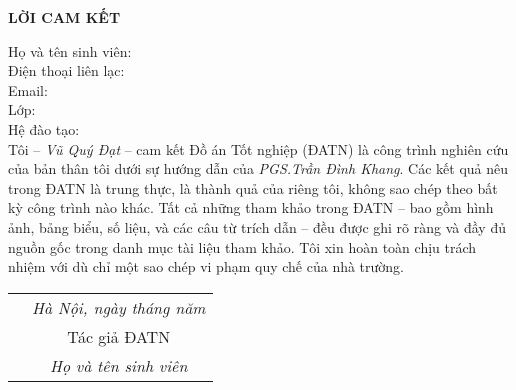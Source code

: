 \documentclass[../DoAn.tex]{subfiles}
\begin{document}
\hfill
\begin{center}
    \LARGE\textbf{LỜI CAM KẾT}\\
\end{center}
\vspace{1cm}
Họ và tên sinh viên:\dotfill\\
Điện thoại liên lạc:\dotfill\\ Email:\dotfill\\
Lớp:\dotfill\\
Hệ đào tạo:\dotfill \\

\vspace{1cm}
Tôi – \emph{Vũ Quý Đạt} – cam kết Đồ án Tốt nghiệp (ĐATN) là công trình nghiên cứu của bản thân tôi dưới sự hướng dẫn của \emph{PGS.Trần Đình Khang}. Các kết quả nêu trong ĐATN là trung thực, là thành quả của riêng tôi, không sao chép theo bất kỳ công trình nào khác. Tất cả những tham khảo trong ĐATN – bao gồm hình ảnh, bảng biểu, số liệu, và các câu từ trích dẫn – đều được ghi rõ ràng và đầy đủ nguồn gốc trong danh mục tài liệu tham khảo. Tôi xin hoàn toàn chịu trách nhiệm với dù chỉ một sao chép vi phạm quy chế của nhà trường.

\begin{table}[H]
\centering
\begin{tabular}{p{5cm} c}
\multicolumn{1}{c}{\textbf{}} &\emph{Hà Nội, ngày\hspace{0.5cm} tháng\hspace{0.5cm}   năm    }\vspace{0.4cm}\\
\textbf{}               & Tác giả ĐATN \vspace{3cm} \\

\textbf{}               & \emph{Họ và tên sinh viên}
\end{tabular}
\end{table}
\end{document}
